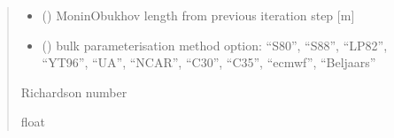 \documentclass[letterpaper,10pt,english]{sphinxmanual}
\begin{document}
\begin{fulllineitems}
\begin{quote}
\begin{description}
\begin{itemize}
\item {} 
\sphinxAtStartPar
{} () \textendash{} Monin\sphinxhyphen{}Obukhov length from previous iteration step {[}m{]}

\item {} 
\sphinxAtStartPar
{} () \textendash{} bulk parameterisation method option: “S80”, “S88”, “LP82”, “YT96”,
“UA”, “NCAR”, “C30”, “C35”, “ecmwf”, “Beljaars”

\end{itemize}

\sphinxAtStartPar
{} \textendash{} Richardson number

\sphinxAtStartPar
float

\end{description}\end{quote}

\end{fulllineitems}

\end{document}
